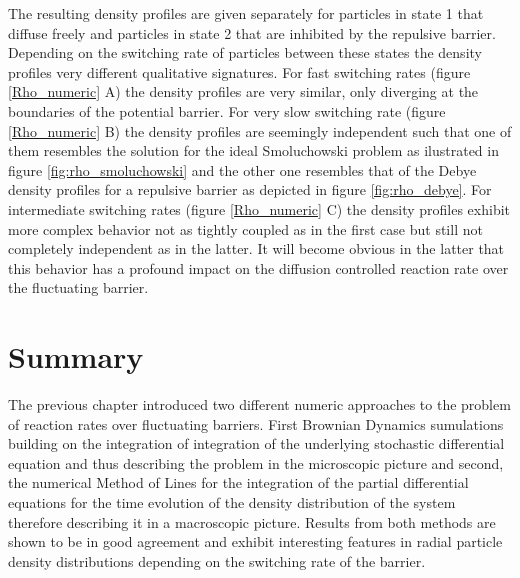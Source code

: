 \newpage
The resulting density profiles are given separately for particles in state 1 that diffuse freely and particles in state 2 that are inhibited by the repulsive barrier. Depending on the switching rate of particles between these states the density profiles very different qualitative signatures.
For fast switching rates  (figure \ref{Rho_numeric} A) the density profiles are very similar, only diverging at the boundaries of the potential barrier. For very slow switching rate (figure \ref{Rho_numeric} B) the density profiles are seemingly independent such that one of them resembles the solution for the ideal Smoluchowski problem as ilustrated in figure \ref{fig:rho_smoluchowski} and the other one resembles that of the Debye density profiles for a repulsive barrier as depicted in figure \ref{fig:rho_debye}. For intermediate switching rates (figure \ref{Rho_numeric} C) the density profiles exhibit more complex behavior not as tightly coupled as in the first case but still not completely independent as in the latter. It will become obvious in the latter that this behavior has a profound impact on the diffusion controlled reaction rate over the fluctuating barrier.


\section{Summary}
The previous chapter introduced two different numeric approaches to the problem of reaction rates over fluctuating barriers. First Brownian Dynamics sumulations building on the integration of integration of the underlying stochastic differential equation and thus describing the problem in the microscopic picture and second, the numerical Method of Lines for the integration of the partial differential equations for the time evolution of the density distribution of the system therefore describing it in a macroscopic picture. Results from both methods are shown to be in good agreement and exhibit interesting features in radial particle density distributions depending on the switching rate of the barrier.

